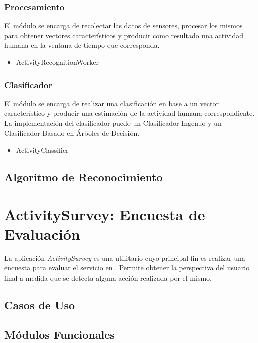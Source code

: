 \subsubsection{Procesamiento}

El módulo se encarga de recolectar las datos de sensores, procesar
los mismos para obtener vectores característicos y producir como resultado
una actividad humana en la ventana de tiempo que corresponda.
\begin{itemize}
\item ActivityRecognitionWorker
\end{itemize}

\subsubsection{Clasificador}

El módulo se encarga de realizar una clasificación en base a un vector
característico y producir una estimación de la actividad humana correspondiente.
La implementación del clasificador puede un Clasificador Ingenuo y
un Clasificador Basado en Árboles de Decisión.
\begin{itemize}
\item ActivityClassifier
\end{itemize}

\subsection{Algoritmo de Reconocimiento}

\section{ActivitySurvey: Encuesta de Evaluación}

\label{sec55:activity}La aplicación \emph{ActivitySurvey} es una
utilitario cuyo principal fin es realizar una encuesta para evaluar
el servicio  en . Permite obtener la perspectiva
del usuario final a medida que se detecta alguna acción realizada
por el mismo. 

\subsection{Casos de Uso}

\subsection{Módulos Funcionales}


